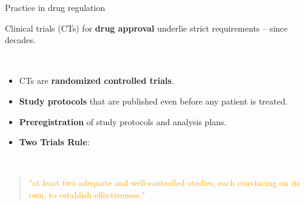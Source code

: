 \documentclass[
  10pt,
  ignorenonframetext,
]{beamer}
\providecommand{\tightlist}{%
  \setlength{\itemsep}{0pt}\setlength{\parskip}{0pt}}
\begin{document}
\begin{frame}
\begin{block}{Practice in drug regulation}
\protect\hypertarget{practice-in-drug-regulation}{}
\vspace{4mm}

Clinical trials (CTs) for \textbf{drug approval} underlie strict
requirements -- since decades.

\(~\)

\begin{itemize}
\tightlist
\item
  CTs are \textbf{randomized controlled trials}.
\end{itemize}

\vspace{2mm}

\begin{itemize}
\tightlist
\item
  \textbf{Study protocols} that are published even before any patient is
  treated.
\end{itemize}

\vspace{2mm}

\begin{itemize}
\tightlist
\item
  \textbf{Preregistration} of study protocols and analysis plans.
\end{itemize}

\vspace{2mm}

\begin{itemize}
\tightlist
\item
  \textbf{Two Trials Rule}:
\end{itemize}

\(~\)

\begin{quote}
\textcolor{orange}{"at least two adequate and well-controlled studies,
each convincing on its own, to establish effectiveness."}
\end{quote}

\(~\)

\(~\)
\end{block}
\end{frame}
\end{document}
